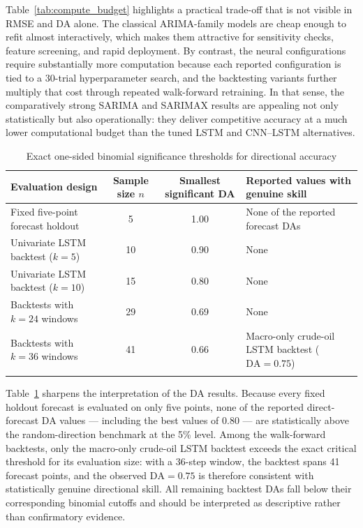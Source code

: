 \documentclass[pdflatex,sn-mathphys-num]{sn-jnl}%
\theoremstyle{thmstyleone}%
\theoremstyle{thmstyletwo}%
\theoremstyle{thmstylethree}%
\begin{document}
Table~\ref{tab:compute_budget} highlights a practical trade-off that is not visible in RMSE and DA alone. The classical ARIMA-family models are cheap enough to refit almost interactively, which makes them attractive for sensitivity checks, feature screening, and rapid deployment. By contrast, the neural configurations require substantially more computation because each reported configuration is tied to a 30-trial hyperparameter search, and the backtesting variants further multiply that cost through repeated walk-forward retraining. In that sense, the comparatively strong SARIMA and SARIMAX results are appealing not only statistically but also operationally: they deliver competitive accuracy at a much lower computational budget than the tuned LSTM and CNN--LSTM alternatives.

\begin{table}[h]
\centering
\small
\caption{Exact one-sided binomial significance thresholds for directional accuracy}
\label{tab:da_significance}
\begin{tabular}{@{}p{3.2cm}ccp{5.5cm}@{}}
\toprule
Evaluation design & Sample size $n$ & Smallest significant DA & Reported values with genuine skill \\
\midrule
Fixed five-point forecast holdout & 5 & 1.00 & None of the reported forecast DAs \\
Univariate LSTM backtest ($k=5$) & 10 & 0.90 & None \\
Univariate LSTM backtest ($k=10$) & 15 & 0.80 & None \\
Backtests with $k=24$ windows & 29 & 0.69 & None \\
Backtests with $k=36$ windows & 41 & 0.66 & Macro-only crude-oil LSTM backtest ($\mathrm{DA}=0.75$) \\
\botrule
\end{tabular}
\end{table}

Table~\ref{tab:da_significance} sharpens the interpretation of the DA results. Because every fixed holdout forecast is evaluated on only five points, none of the reported direct-forecast DA values --- including the best values of 0.80 --- are statistically above the random-direction benchmark at the 5\% level. Among the walk-forward backtests, only the macro-only crude-oil LSTM backtest exceeds the exact critical threshold for its evaluation size: with a 36-step window, the backtest spans 41 forecast points, and the observed $\mathrm{DA}=0.75$ is therefore consistent with statistically genuine directional skill. All remaining backtest DAs fall below their corresponding binomial cutoffs and should be interpreted as descriptive rather than confirmatory evidence.
\end{document}
